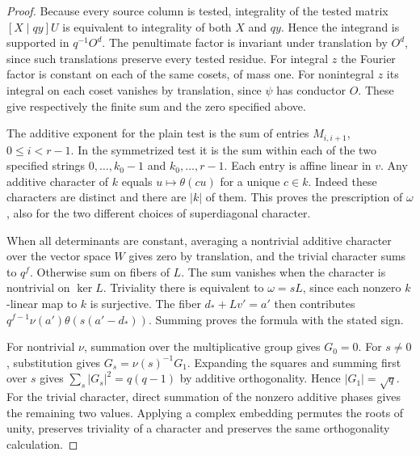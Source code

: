 \documentclass[a4paper,11pt]{article}
\theoremstyle{definition}
\theoremstyle{remark}
\numberwithin{equation}{section}
\begin{document}
\begin{proof}
Because every source column is tested, integrality of the
tested matrix \([X\mid qy]U\) is equivalent to integrality
of both \(X\) and \(qy\). Hence the integrand is supported in
\(q^{-1}O^d\). The penultimate factor is invariant under
translation by \(O^d\), since such translations preserve
every tested residue. For integral \(z\) the Fourier factor
is constant on each of the same cosets, of mass one. For
nonintegral \(z\) its integral on each coset vanishes by
translation, since \(\psi\) has conductor \(O\). These give
respectively the finite sum and the zero specified above.

The additive exponent for the plain test is the sum of
entries \(M_{i,i+1}\), \(0\le i<r-1\). In the symmetrized
test it is the sum within each of the two specified strings
\(0,\ldots,k_0-1\) and \(k_0,\ldots,r-1\).
Each entry is affine linear in \(v\). Any additive character
of \(k\) equals \(u\mapsto\theta(cu)\) for a unique \(c\in k\).
Indeed these characters are distinct and there are \(|k|\)
of them. This proves the prescription of \(\omega\), also for
the two different choices of superdiagonal character.

When all determinants are constant, averaging a nontrivial
additive character over the vector space \(W\) gives zero by
translation, and the trivial character sums to \(q^f\).
Otherwise sum on fibers of \(L\). The sum vanishes when the
character is nontrivial on \(\ker L\). Triviality there is
equivalent to \(\omega=sL\), since each nonzero \(k\)-linear
map to \(k\) is surjective. The fiber \(d_*+Lv'=a'\)
then contributes \(q^{f-1}\nu(a')\theta(s(a'-d_*))\).
Summing proves the formula with the stated sign.

For nontrivial \(\nu\), summation over the multiplicative
group gives \(G_0=0\). For \(s\ne0\), substitution gives
\(G_s=\nu(s)^{-1}G_1\). Expanding the squares and summing
first over \(s\) gives \(\sum_s|G_s|^2=q(q-1)\) by additive
orthogonality. Hence \(|G_1|=\sqrt q\). For the trivial
character, direct summation of the nonzero additive phases
gives the remaining two values. Applying a complex embedding
permutes the roots of unity, preserves triviality of a
character and preserves the same orthogonality calculation.
\end{proof}
\end{document}
